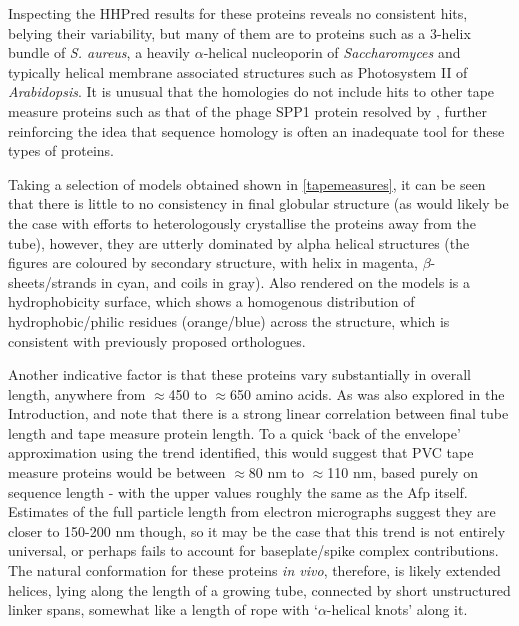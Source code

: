 Inspecting the HHPred results for these proteins reveals no consistent hits, belying their variability, but many of them are to proteins such as a 3-helix bundle of \emph{S. aureus}, a heavily $\alpha$-helical nucleoporin of \emph{Saccharomyces} and typically helical membrane associated structures such as Photosystem II of \emph{Arabidopsis}. It is unusual that the homologies do not include hits to other tape measure proteins such as that of the phage SPP1 protein resolved by \cite{Chaban2015}, further reinforcing the idea that sequence homology is often an inadequate tool for these types of proteins.

Taking a selection of models obtained shown in \vref{tapemeasures}, it can be seen that there is little to no consistency in final globular structure (as would likely be the case with efforts to heterologously crystallise the proteins away from the tube), however, they are utterly dominated by alpha helical structures (the figures are coloured by secondary structure, with helix in magenta, $\beta$-sheets/strands in cyan, and coils in gray). Also rendered on the models is a hydrophobicity surface, which shows a homogenous distribution of hydrophobic/philic residues (orange/blue) across the structure, which is consistent with previously proposed orthologues.

Another indicative factor is that these proteins vary substantially in overall length, anywhere from $\approx$450 to $\approx$650 amino acids. As was also explored in the Introduction, \cite{Rybakova2015} and \cite{Pedulla2003} note that there is a strong linear correlation between final tube length and tape measure protein length. To a quick `back of the envelope' approximation using the trend identified, this would suggest that PVC tape measure proteins would be between $\approx$80 nm to $\approx$110 nm, based purely on sequence length - with the upper values roughly the same as the Afp itself. Estimates of the full particle length from electron micrographs suggest they are closer to 150-200 nm though, so it may be the case that this trend is not entirely universal, or perhaps fails to account for baseplate/spike complex contributions. The natural conformation for these proteins \emph{in vivo}, therefore, is likely extended helices, lying along the length of a growing tube, connected by short unstructured linker spans, somewhat like a length of rope with `$\alpha$-helical knots' along it.

